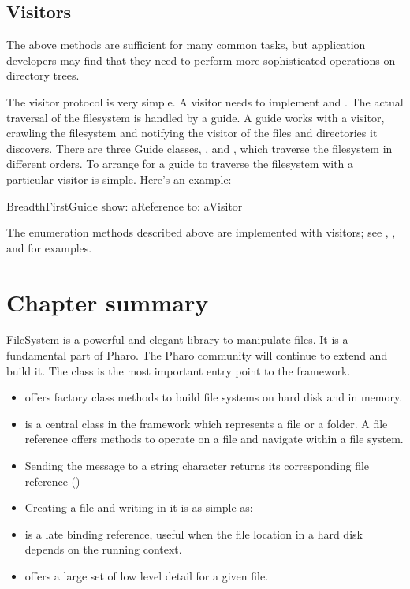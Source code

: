 \documentclass[a4paper,10pt,twoside]{book}
\begin{document}
\subsection{Visitors}

The above methods are sufficient for many common tasks, but application developers may find that they need to perform more sophisticated operations on directory trees.

The visitor protocol is very simple. A visitor needs to implement  and . The actual traversal of the filesystem is handled by a guide. A guide works with a visitor, crawling the filesystem and notifying the visitor of the files and directories it discovers. There are three Guide classes, ,  and  , which traverse the filesystem in different orders. To arrange for a guide to traverse the filesystem with a particular visitor is simple. Here's an example:

\begin{code}{}
BreadthFirstGuide show: aReference to: aVisitor
\end{code}	

The enumeration methods described above are implemented with visitors; see , , and  for examples.


\section{Chapter summary}

FileSystem is a powerful and elegant library to manipulate files. It is a fundamental part of Pharo. The Pharo community will continue to extend and build it. The class  is the most important entry point to the framework.

\begin{itemize}
\item {} offers factory class methods to build file systems on hard disk and in memory.
\item {} is a central class in the framework which represents a file or a folder. A file reference offers methods to operate on a file and navigate within a file system.
\item Sending the message  to a string character returns its corresponding file reference (\eg {})
\item Creating a file and writing in it is as simple as: 
\item {} is a late binding reference, useful when the file location in a hard disk depends on the running context.
\item {} offers a large set of low level detail for a given file.
\end{itemize}

\ifx\wholebook\relax\else
   
   
\end{document}
